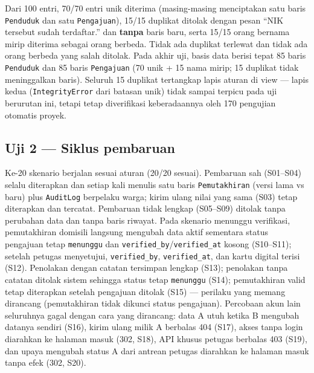 \documentclass[11pt,a4paper]{article}
\begin{document}
Dari 100 entri, 70/70 entri unik diterima (masing-masing menciptakan satu baris \texttt{Penduduk} dan satu \texttt{Pengajuan}), 15/15 duplikat ditolak dengan pesan ``NIK tersebut sudah terdaftar.'' dan \textbf{tanpa} baris baru, serta 15/15 orang bernama mirip diterima sebagai orang berbeda. Tidak ada duplikat terlewat dan tidak ada orang berbeda yang salah ditolak. Pada akhir uji, basis data berisi tepat 85 baris \texttt{Penduduk} dan 85 baris \texttt{Pengajuan} (70 unik + 15 nama mirip; 15 duplikat tidak meninggalkan baris). Seluruh 15 duplikat tertangkap lapis aturan di view --- lapis kedua (\texttt{IntegrityError} dari batasan unik) tidak sampai terpicu pada uji berurutan ini, tetapi tetap diverifikasi keberadaannya oleh 170 pengujian otomatis proyek.

\subsection{Uji 2 --- Siklus pembaruan}

Ke-20 skenario berjalan sesuai aturan (20/20 sesuai). Pembaruan sah (S01--S04) selalu diterapkan dan setiap kali menulis satu baris \texttt{Pemutakhiran} (versi lama vs baru) plus \texttt{AuditLog} berpelaku warga; kirim ulang nilai yang sama (S03) tetap diterapkan dan tercatat. Pembaruan tidak lengkap (S05--S09) ditolak tanpa perubahan data dan tanpa baris riwayat. Pada skenario menunggu verifikasi, pemutakhiran domisili langsung mengubah data aktif sementara status pengajuan tetap \texttt{menunggu} dan \texttt{verified\_by}/\texttt{verified\_at} kosong (S10--S11); setelah petugas menyetujui, \texttt{verified\_by}, \texttt{verified\_at}, dan kartu digital terisi (S12). Penolakan dengan catatan tersimpan lengkap (S13); penolakan tanpa catatan ditolak sistem sehingga status tetap \texttt{menunggu} (S14); pemutakhiran valid tetap diterapkan setelah pengajuan ditolak (S15) --- perilaku yang memang dirancang (pemutakhiran tidak dikunci status pengajuan). Percobaan akun lain seluruhnya gagal dengan cara yang dirancang: data A utuh ketika B mengubah datanya sendiri (S16), kirim ulang milik A berbalas 404 (S17), akses tanpa login diarahkan ke halaman masuk (302, S18), API khusus petugas berbalas 403 (S19), dan upaya mengubah status A dari antrean petugas diarahkan ke halaman masuk tanpa efek (302, S20).
\end{document}
